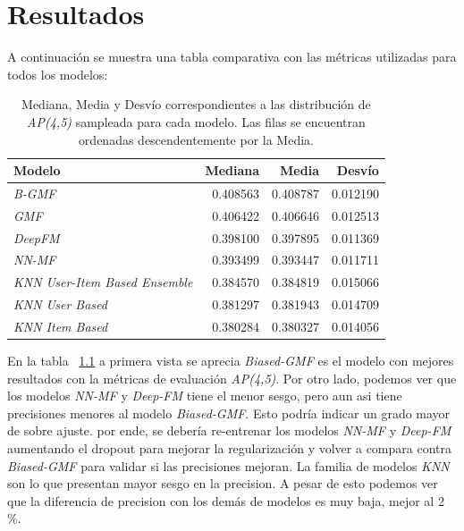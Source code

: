\documentclass[11pt,a4paper,twoside]{thesis}
\begin{document}
\chapter{Resultados}

A continuación se muestra una tabla comparativa con las métricas utilizadas para todos los modelos:

\begin{table}[!htb]
	\centering
	\footnotesize
	\begin{tabular}{lrrr}
	\hline
		Modelo                            & Mediana  & Media    & Desvío  \\
	\hline
	\textit{B-GMF}                        & 0.408563 & 0.408787 & 0.012190 \\
	\textit{GMF}                          & 0.406422 & 0.406646 & 0.012513 \\
	\textit{DeepFM}                       & 0.398100 & 0.397895 & 0.011369 \\
	\textit{NN-MF}                        & 0.393499 & 0.393447 & 0.011711 \\
	\textit{KNN User-Item Based Ensemble} & 0.384570 & 0.384819 & 0.015066 \\
	\textit{KNN User Based}               & 0.381297 & 0.381943 & 0.014709 \\
	\textit{KNN Item Based}               & 0.380284 & 0.380327 & 0.014056 \\
	\hline
	\end{tabular}
	\caption{
		Mediana, Media y Desvío correspondientes a las distribución de 
		\textit{AP(4,5)} sampleada para cada modelo. Las filas se encuentran ordenadas descendentemente por la Media.
	}
	\label{table:ap_at_k}
\end{table}

En la tabla ~\ref{table:ap_at_k} a primera vista se aprecia \textit{Biased-GMF} es el modelo con mejores resultados con la métricas de evaluación \textit{AP(4,5)}.  Por otro lado, podemos ver que los modelos \textit{NN-MF} y \textit{Deep-FM} tiene el menor sesgo, pero aun asi tiene precisiones menores al modelo \textit{Biased-GMF}. Esto podría indicar un grado mayor de sobre ajuste. por ende, se debería re-entrenar los modelos \textit{NN-MF} y \textit{Deep-FM} aumentando el dropout para mejorar la regularización y volver a compara contra \textit{Biased-GMF} para validar si las precisiones mejoran. La familia de modelos \textit{KNN} son lo que presentan mayor sesgo en la precision. A pesar de esto podemos ver que la diferencia de precision con los demás de modelos es muy baja, mejor al 2 \%.
\end{document}
